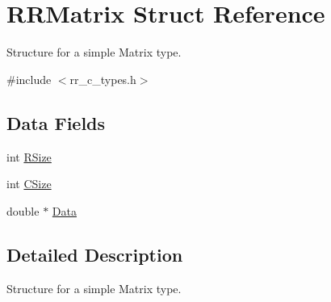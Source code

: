 \hypertarget{struct_r_r_matrix}{
\section{\-R\-R\-Matrix \-Struct \-Reference}
\label{struct_r_r_matrix}
}


\-Structure for a simple \-Matrix type.  




{\ttfamily \#include $<$rr\-\_\-c\-\_\-types.\-h$>$}

\subsection*{\-Data \-Fields}
\begin{DoxyCompactItemize}
\item 
int \hyperlink{struct_r_r_matrix_a4d8512c879223c0e0d1522dae38e7819}{\-R\-Size}
\item 
int \hyperlink{struct_r_r_matrix_a17c9a5894aa9cb3789346dcaa9c370bb}{\-C\-Size}
\item 
double $\ast$ \hyperlink{struct_r_r_matrix_a7c5cbda3aa940f4b0d6e8a1679307dfc}{\-Data}
\end{DoxyCompactItemize}


\subsection{\-Detailed \-Description}
\-Structure for a simple \-Matrix type. 

